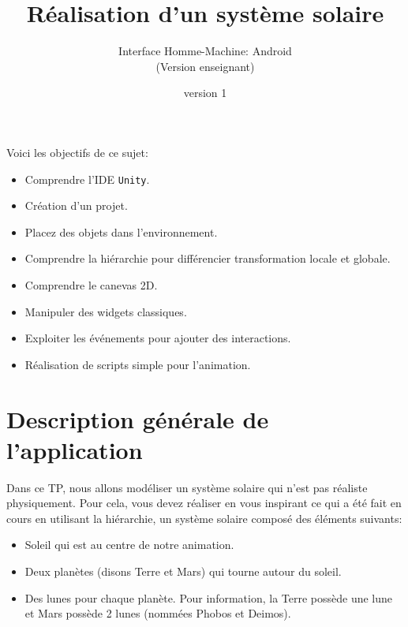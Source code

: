 \documentclass[a4paper,10pt]{article}
\newenvironment{attention}%
{\begin{tcolorbox}[breakable,colback=green!25!white,colframe=red!55!black,title=Attention]}%
{\end{tcolorbox}}
\begin{document}
	


\title{\vspace*{-1cm}Réalisation d'un système solaire}
\author{\vspace*{-1.5cm}Interface Homme-Machine: Android
\begin{ensnote}
	(Version enseignant)
\end{ensnote}
}
\date{\vspace*{-1.5cm}version 1}
\maketitle
\thispagestyle{fancy}

Voici les objectifs de ce sujet:
\begin{itemize}
	\item Comprendre l'IDE \texttt{Unity}.
	\item Création d'un projet.
	\item Placez des objets dans l'environnement.
	\item Comprendre la hiérarchie pour différencier transformation locale et globale.
	\item Comprendre le canevas 2D.
	\item Manipuler des widgets classiques.
	\item Exploiter les événements pour ajouter des interactions.
	\item Réalisation de scripts simple pour l'animation.
\end{itemize}


%	

\section*{Description générale de l'application}

Dans ce TP, nous allons modéliser un système solaire qui n'est pas réaliste physiquement. Pour cela, vous devez réaliser en vous inspirant ce qui a été fait en cours en utilisant la hiérarchie, un système solaire composé des éléments suivants:
\begin{itemize}
	\item Soleil qui est au centre de notre animation.
	\item Deux planètes (disons Terre et Mars) qui tourne autour du soleil.
	\item Des lunes pour chaque planète. Pour information, la Terre possède une lune et Mars possède 2 lunes (nommées Phobos et Deimos). 
\end{itemize}
\end{document}
